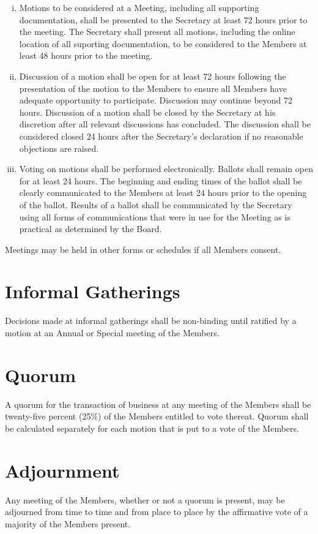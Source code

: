 \documentclass[10pt, english]{xorgdocs}
\begin{document}
\begin{enumerate}[(i)\hspace{.2cm}]
	\item Motions to be considered at a Meeting, including all supporting
	documentation, shall be presented to the Secretary at least 72 hours
	prior to the meeting. The Secretary shall present all motions, including
	the online location of all suporting documentation, to be considered to
	the Members at least 48 hours prior to the meeting.

	\item Discussion of a motion shall be open for at least 72 hours
	following the presentation of the motion to the Members to ensure all
	Members have adequate opportunity to participate. Discussion may
	continue beyond 72 hours. Discussion of a motion shall be closed by the
	Secretary at his discretion after all relevant discussions has
	concluded. The discussion shall be considered closed 24 hours after the
	Secretary's declaration if no reasonable objections are raised.

	\item Voting on motions shall be performed electronically. Ballots shall
	remain open for at least 24 hours. The beginning and ending times of
	the ballot shall be clearly communicated to the Members at least 24
	hours prior to the opening of the ballot. Results of a ballot shall be
	communicated by the Secretary using all forms of communications that
	were in use for the Meeting as is practical as determined by the Board.
\end{enumerate}

Meetings may be held in other forms or schedules if all Members consent.

\section{Informal Gatherings}
Decisions made at informal gatherings shall be non-binding until ratified by a
motion at an Annual or Special meeting of the Members.

\section{Quorum}
A quorum for the transaction of business at any meeting of the Members shall be
twenty-five percent (25\%) of the Members entitled to vote thereat. Quorum shall
be calculated separately for each motion that is put to a vote of the Members.

\section{Adjournment}
Any meeting of the Members, whether or not a quorum is present, may be adjourned
from time to time and from place to place by the affirmative vote of a majority
of the Members present.
\end{document}
